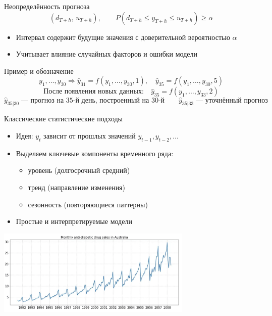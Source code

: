 \documentclass[aspectratio=1610,12pt]{beamer}
\begin{document}
\begin{frame}{Неопределённость прогноза}
\[
(d_{T+h},\,u_{T+h}), \qquad
P\!\left(d_{T+h}\le y_{T+h}\le u_{T+h}\right)\ge \alpha
\]
\begin{itemize}
  \item Интервал содержит будущие значения с доверительной вероятностью $\alpha$
  \item Учитывает влияние случайных факторов и ошибки модели
\end{itemize}
\end{frame}


\begin{frame}{Пример и обозначение}
\small
\[
y_1,\ldots,y_{30} \Rightarrow
\hat{y}_{31}=f(y_1,\ldots,y_{30},1),\quad
\hat{y}_{35}=f(y_1,\ldots,y_{30},5)
\]
\[
\text{После появления новых данных:}\quad
\hat{y}_{35}=f(y_1,\ldots,y_{33},2)
\]
\[
\hat{y}_{35|30} \;\text{— прогноз на 35-й день, построенный на 30-й}\quad\quad
\hat{y}_{35|33} \;\text{— уточнённый прогноз}
\]
\end{frame}



\begin{frame}{Классические статистические подходы}
\begin{itemize}
    \item Идея: $y_t$ зависит от прошлых значений $y_{t-1}, y_{t-2}, \dots$
    \item Выделяем ключевые компоненты временного ряда:
    \begin{itemize}
        \item уровень (долгосрочный средний)
        \item тренд (направление изменения)
        \item сезонность (повторяющиеся паттерны)
    \end{itemize}
    \item Простые и интерпретируемые модели
\end{itemize}
\vspace{0.6em}
\centering
\includegraphics[width=0.7\textwidth]{trend_seasonality_example.png}
\end{frame}
\end{document}
